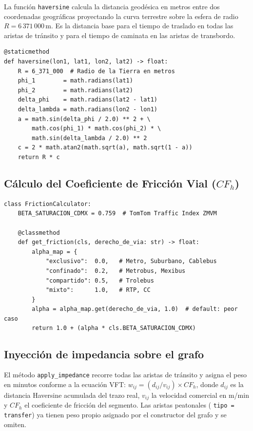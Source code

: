 La función \texttt{haversine} calcula la distancia geodésica en metros entre dos
coordenadas geográficas proyectando la curva terrestre sobre la esfera de radio
$R = 6\,371\,000$\,m. Es la distancia base para el tiempo de traslado en todas
las aristas de tránsito y para el tiempo de caminata en las aristas de
transbordo.

\begin{lstlisting}[style=estiloPython,
    caption={Implementación de la fórmula de Haversine.
             \texttt{src/core/models/impedance.py}.},
    label=lst:haversine]
@staticmethod
def haversine(lon1, lat1, lon2, lat2) -> float:
    R = 6_371_000  # Radio de la Tierra en metros
    phi_1        = math.radians(lat1)
    phi_2        = math.radians(lat2)
    delta_phi    = math.radians(lat2 - lat1)
    delta_lambda = math.radians(lon2 - lon1)
    a = math.sin(delta_phi / 2.0) ** 2 + \
        math.cos(phi_1) * math.cos(phi_2) * \
        math.sin(delta_lambda / 2.0) ** 2
    c = 2 * math.atan2(math.sqrt(a), math.sqrt(1 - a))
    return R * c
\end{lstlisting}

\subsection*{Cálculo del Coeficiente de Fricción Vial ($CF_h$)}

\begin{lstlisting}[style=estiloPython,
    caption={Cálculo del Coeficiente de Fricción Vial según derecho de vía.
             \texttt{src/core/models/impedance.py}.},
    label=lst:cf]
class FrictionCalculator:
    BETA_SATURACION_CDMX = 0.759  # TomTom Traffic Index ZMVM

    @classmethod
    def get_friction(cls, derecho_de_via: str) -> float:
        alpha_map = {
            "exclusivo":  0.0,   # Metro, Suburbano, Cablebus
            "confinado":  0.2,   # Metrobus, Mexibus
            "compartido": 0.5,   # Trolebus
            "mixto":      1.0,   # RTP, CC
        }
        alpha = alpha_map.get(derecho_de_via, 1.0)  # default: peor caso
        return 1.0 + (alpha * cls.BETA_SATURACION_CDMX)
\end{lstlisting}

\subsection*{Inyección de impedancia sobre el grafo}

El método \texttt{apply\_impedance} recorre todas las aristas de tránsito y
asigna el peso en minutos conforme a la ecuación VFT:
$w_{ij} = (d_{ij} / v_{ij}) \times CF_h$, donde $d_{ij}$ es la distancia
Haversine acumulada del trazo real, $v_{ij}$ la velocidad comercial en m/min y
$CF_h$ el coeficiente de fricción del segmento. Las aristas peatonales (
\texttt{tipo = transfer}) ya tienen peso propio asignado por el constructor del
grafo y se omiten.

